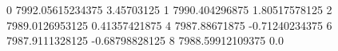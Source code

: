 0 7992.05615234375 3.45703125
1 7990.404296875 1.80517578125
2 7989.0126953125 0.41357421875
4 7987.88671875 -0.71240234375
6 7987.9111328125 -0.68798828125
8 7988.59912109375 0.0
